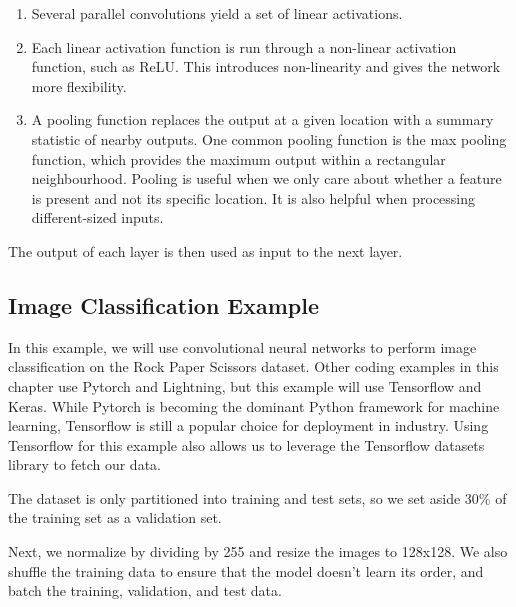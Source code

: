 \documentclass{article}
\begin{document}
\begin{enumerate}
    \item Several parallel convolutions yield a set of linear activations.
    \item Each linear activation function is run through a non-linear activation function, such as ReLU. This introduces non-linearity and gives the network more flexibility. %
    \item A pooling function replaces the output at a given location with a summary statistic of nearby outputs. One common pooling function is the max pooling function, which provides the maximum output within a rectangular neighbourhood. Pooling is useful when we only care about whether a feature is present and not its specific location. It is also helpful when processing different-sized inputs.
\end{enumerate}

The output of each layer is then used as input to the next layer.

\subsection{Image Classification Example}

In this example, we will use convolutional neural networks to perform image classification on the Rock Paper Scissors dataset. Other coding examples in this chapter use Pytorch and Lightning, but this example will use Tensorflow and Keras. While Pytorch is becoming the dominant Python framework for machine learning, Tensorflow is still a popular choice for deployment in industry. Using Tensorflow for this example also allows us to leverage the Tensorflow datasets library to fetch our data.



The dataset is only partitioned into training and test sets, so we set aside 30\% of the training set as a validation set.



Next, we normalize by dividing by 255 and resize the images to 128x128. We also shuffle the training data to ensure that the model doesn't learn its order, and batch the training, validation, and test data.


\end{document}
